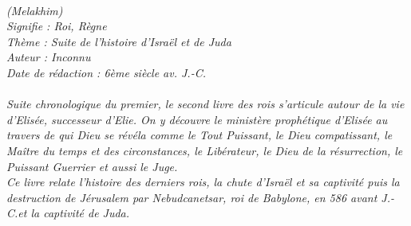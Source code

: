 \BFont
\noindent\hrulefill
{\footnotesize
\textit{
\bigskip
{\centering{}
\\(Melakhim)
\\Signifie : Roi, Règne
\\Thème : Suite de l'histoire d'Israël et de Juda
\\Auteur : Inconnu
\\Date de rédaction : 6ème siècle av. J.-C.\\}
}
\textit{
\\Suite chronologique du premier, le second livre des rois s’articule autour de la vie d’Elisée, successeur d’Elie. On y découvre le ministère prophétique d’Elisée au travers de qui Dieu se révéla comme le Tout Puissant, le Dieu compatissant, le Maître du temps et des circonstances, le Libérateur, le Dieu de la résurrection, le Puissant Guerrier et aussi le Juge.
\\Ce livre relate l’histoire des derniers rois, la chute d’Israël et sa captivité puis la destruction de Jérusalem par Nebudcanetsar, roi de Babylone, en 586 avant J.-C.et la captivité de Juda.\bigskip
}
}
\par\nobreak\noindent\hrulefill
